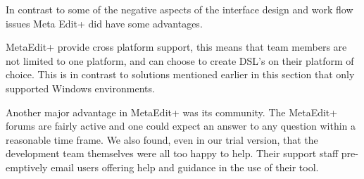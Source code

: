 In contrast to some of the negative aspects of the interface design and work flow issues Meta Edit+ did have some advantages.

MetaEdit+ provide cross platform support, this means that team members are not limited to one platform, and can choose to create DSL’s on their platform of choice. This is in contrast to solutions mentioned earlier in this section that only supported Windows environments. \par

Another major advantage in MetaEdit+ was its community. The MetaEdit+ forums are fairly active and one could expect an answer to any question within a reasonable time frame.  We also found, even in our trial version, that the development team themselves were all too happy to help. Their support staff pre-emptively email users offering help and guidance in the use of their tool.
